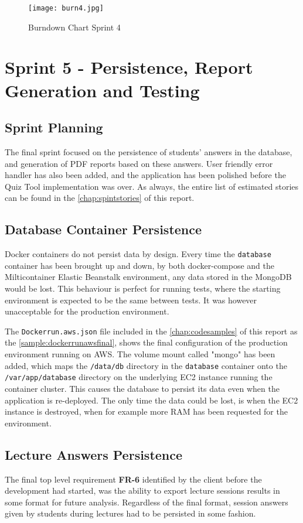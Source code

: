 \begin{figure}[h!]
    \centering
    \texttt{[image: burn4.jpg]}
    \caption{Burndown Chart Sprint 4}
    \label{fig:burn4}
\end{figure}

\section{Sprint 5 - Persistence, Report Generation and Testing}
\subsection{Sprint Planning}
The final sprint focused on the persistence of students' answers in the database, and
generation of PDF reports based on these answers. User friendly error handler has
also been added, and the application has been polished before the Quiz Tool implementation
was over. As always, the entire list of estimated stories
can be found in the \autoref{chap:spintstories} of this report.

\subsection{Database Container Persistence}
Docker containers do not persist data by design. Every time the \texttt{database}
container has been brought up and down, by both docker-compose and the
Milticontainer Elastic Beanstalk environment, any data stored in the MongoDB
would be lost. This behaviour is perfect for running tests, where the starting
environment is expected to be the same between tests. It was however unacceptable
for the production environment.

The \texttt{Dockerrun.aws.json} file included in the \autoref{chap:codesamples} of this report
as the \autoref{sample:dockerrunawsfinal}, shows the final configuration of the production
environment running on AWS. The volume mount called "mongo" has been added, which maps the
\texttt{/data/db} directory in the \texttt{database} container onto the \texttt{/var/app/database}
directory on the underlying EC2 instance running the container cluster. This causes the database
to persist its data even when the application is re-deployed. The only time the data could
be lost, is when the EC2 instance is destroyed, when for example more RAM has been requested
for the environment.

\subsection{Lecture Answers Persistence}
The final top level requirement \textbf{FR-6} identified by the client before the
development had started, was the ability to export lecture sessions results in some format
for future analysis. Regardless of the final format, session answers given by students
during lectures had to be persisted in some fashion.


